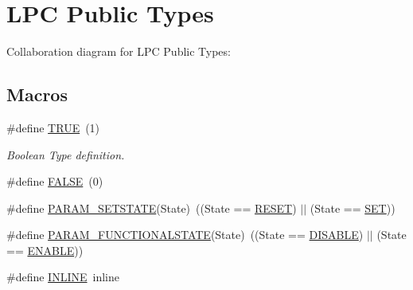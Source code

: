 \hypertarget{group___l_p_c___types___public___types}{}\section{L\+PC Public Types}
\label{group___l_p_c___types___public___types}
Collaboration diagram for L\+PC Public Types\+:
\subsection*{Macros}
\begin{DoxyCompactItemize}
\item 
\#define \hyperlink{group___l_p_c___types___public___types_gaa8cecfc5c5c054d2875c03e77b7be15d}{T\+R\+UE}~(1)
\begin{DoxyCompactList}\small\item\em Boolean Type definition. \end{DoxyCompactList}\item 
\#define \hyperlink{group___l_p_c___types___public___types_gaa93f0eb578d23995850d61f7d61c55c1}{F\+A\+L\+SE}~(0)
\item 
\#define \hyperlink{group___l_p_c___types___public___types_gafb6827323e4c501477936a84bd733b4f}{P\+A\+R\+A\+M\+\_\+\+S\+E\+T\+S\+T\+A\+TE}(State)~((State == \hyperlink{group___l_p_c___types___public___types_gga89136caac2e14c55151f527ac02daaffa589b7d94a3d91d145720e2fed0eb3a05}{R\+E\+S\+ET}) $\vert$$\vert$ (State == \hyperlink{group___l_p_c___types___public___types_gga89136caac2e14c55151f527ac02daaffab44c8101cc294c074709ec1b14211792}{S\+ET}))
\item 
\#define \hyperlink{group___l_p_c___types___public___types_ga5475435ea985fe5abbf2048e87e3e682}{P\+A\+R\+A\+M\+\_\+\+F\+U\+N\+C\+T\+I\+O\+N\+A\+L\+S\+T\+A\+TE}(State)~((State == \hyperlink{group___l_p_c___types___public___types_ggac9a7e9a35d2513ec15c3b537aaa4fba1ad3a9df141be0ccf10389b640f492b26d}{D\+I\+S\+A\+B\+LE}) $\vert$$\vert$ (State == \hyperlink{group___l_p_c___types___public___types_ggac9a7e9a35d2513ec15c3b537aaa4fba1a7d46875fa3ebd2c34d2756950eda83bf}{E\+N\+A\+B\+LE}))
\item 
\#define \hyperlink{group___l_p_c___types___public___types_ga2eb6f9e0395b47b8d5e3eeae4fe0c116}{I\+N\+L\+I\+NE}~inline
\end{DoxyCompactItemize}
